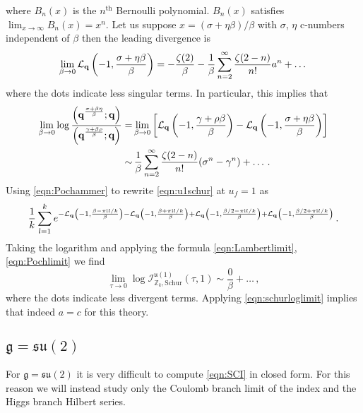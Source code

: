 \documentclass[main.tex]{subfiles}
\begin{document}
where $B_n(x)$ is the $n^{\text{th}}$ Bernoulli polynomial. $B_n(x)$ satisfies $\lim_{x\to\infty}B_n(x)= x^n$. Let us suppose $x=(\sigma+\eta\beta)/\beta$ with $\sigma$, $\eta$ c-numbers independent of $\beta$ then the leading divergence is
\begin{equation}\label{eqn:Lambertlimit}
\lim_{\beta\to0}\mathcal{L}_{\mathbf{q}}\left(-1,\frac{\sigma+\eta\beta}{\beta}\right)=-\frac{\zeta(2)}{\beta}-\frac{1}{\beta}\sum_{n=2}^{\infty}\frac{\zeta(2-n)}{n!}a^n+\dots
\end{equation}
where the dots indicate less singular terms. In particular, this implies that
\begin{equation}\label{eqn:Pochlimit}
\begin{aligned}
\lim_{\beta\to0}\log\frac{\left(\mathbf{q}^{\frac{\sigma+\beta \eta}{\beta}};\mathbf{q}\right)}{\left(\mathbf{q}^{\frac{\gamma+\beta \rho}{\beta}};\mathbf{q}\right)}=&\lim_{\beta\to0}\left[\mathcal{L}_{\mathbf{q}}\left(-1,\frac{\gamma+\rho \beta}{\beta}\right)-\mathcal{L}_{\mathbf{q}}\left(-1,\frac{\sigma+\eta \beta}{\beta}\right)\right]\\
\sim&\,\frac{1}{\beta}\sum_{n=2}^{\infty}\frac{\zeta(2-n)}{n!}(\sigma^n-\gamma^n)+\dots\,.
\end{aligned}
\end{equation}
Using \eqref{eqn:Pochammer} to rewrite \eqref{eqn:u1schur} at $u_f=1$ as
\begin{equation}\label{eqn:u1Lambert}
\frac{1}{k}\sum_{l=1}^ke^{-\mathcal{L}_{\mathbf{q}}\left(-1,\frac{\beta-\pi\mathrm{i} l/k}{\beta}\right)-\mathcal{L}_{\mathbf{q}}\left(-1,\frac{\beta+\pi\mathrm{i} l/k}{\beta}\right)+\mathcal{L}_{\mathbf{q}}\left(-1,\frac{\beta/2-\pi\mathrm{i} l/k}{\beta}\right)+\mathcal{L}_{\mathbf{q}}\left(-1,\frac{\beta/2+\pi\mathrm{i} l/k}{\beta}\right)}\,.
\end{equation} 
Taking the logarithm and applying the formula \eqref{eqn:Lambertlimit}, \eqref{eqn:Pochlimit} we find
\begin{equation}
\lim_{\tau\to0}\log \mathcal{I}^{\mathfrak{u}(1)}_{\mathbb{Z}_k,\text{Schur}}(\tau,1)\sim\frac{0}{\beta}+\dots\,,
\end{equation}
where the dots indicate less divergent terms. Applying \eqref{eqn:schurloglimit} implies that indeed $a=c$ for this theory.

\subsection{\texorpdfstring{$\mathfrak{g}=\mathfrak{su}(2)$}{g=su(2)}}\label{sec:su2} 
For $\mathfrak{g}=\mathfrak{su}(2)$ it is very difficult to compute \eqref{eqn:SCI} in closed form. For this reason we will instead study only the Coulomb branch limit of the index and the Higgs branch Hilbert series.
\end{document}
